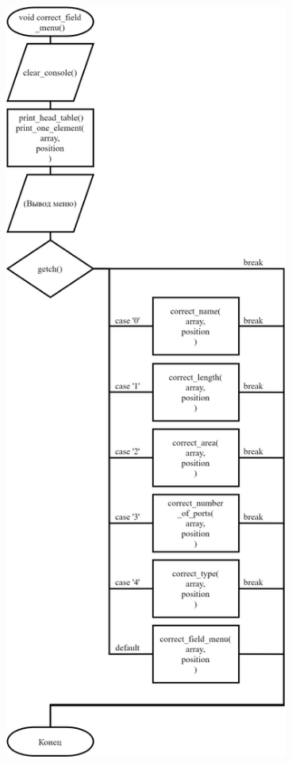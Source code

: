 \begin{figure}[!htp]
    \includegraphics[height=25cm]{../../Makefile-project/src/menu/correct_field/correct_field-2.png}
\end{figure}

